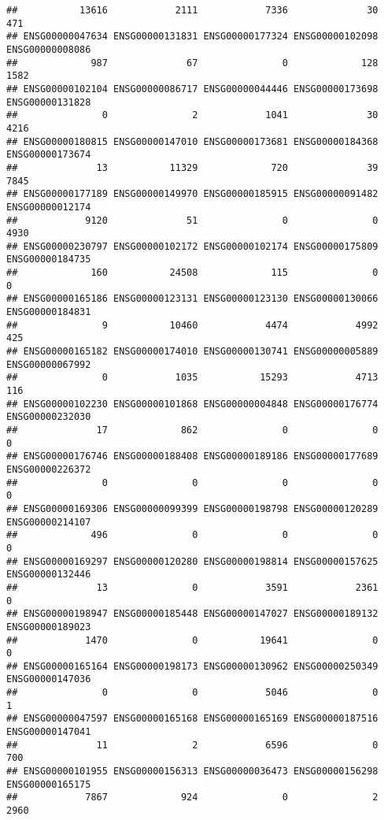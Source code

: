 \documentclass[
]{article}
\begin{document}
\begin{verbatim}
##           13616            2111            7336              30             471 
## ENSG00000047634 ENSG00000131831 ENSG00000177324 ENSG00000102098 ENSG00000008086 
##             987              67               0             128            1582 
## ENSG00000102104 ENSG00000086717 ENSG00000044446 ENSG00000173698 ENSG00000131828 
##               0               2            1041              30            4216 
## ENSG00000180815 ENSG00000147010 ENSG00000173681 ENSG00000184368 ENSG00000173674 
##              13           11329             720              39            7845 
## ENSG00000177189 ENSG00000149970 ENSG00000185915 ENSG00000091482 ENSG00000012174 
##            9120              51               0               0            4930 
## ENSG00000230797 ENSG00000102172 ENSG00000102174 ENSG00000175809 ENSG00000184735 
##             160           24508             115               0               0 
## ENSG00000165186 ENSG00000123131 ENSG00000123130 ENSG00000130066 ENSG00000184831 
##               9           10460            4474            4992             425 
## ENSG00000165182 ENSG00000174010 ENSG00000130741 ENSG00000005889 ENSG00000067992 
##               0            1035           15293            4713             116 
## ENSG00000102230 ENSG00000101868 ENSG00000004848 ENSG00000176774 ENSG00000232030 
##              17             862               0               0               0 
## ENSG00000176746 ENSG00000188408 ENSG00000189186 ENSG00000177689 ENSG00000226372 
##               0               0               0               0               0 
## ENSG00000169306 ENSG00000099399 ENSG00000198798 ENSG00000120289 ENSG00000214107 
##             496               0               0               0               0 
## ENSG00000169297 ENSG00000120280 ENSG00000198814 ENSG00000157625 ENSG00000132446 
##              13               0            3591            2361               0 
## ENSG00000198947 ENSG00000185448 ENSG00000147027 ENSG00000189132 ENSG00000189023 
##            1470               0           19641               0               0 
## ENSG00000165164 ENSG00000198173 ENSG00000130962 ENSG00000250349 ENSG00000147036 
##               0               0            5046               0               1 
## ENSG00000047597 ENSG00000165168 ENSG00000165169 ENSG00000187516 ENSG00000147041 
##              11               2            6596               0             700 
## ENSG00000101955 ENSG00000156313 ENSG00000036473 ENSG00000156298 ENSG00000165175 
##            7867             924               0               2            2960 

\end{verbatim}
\end{document}
